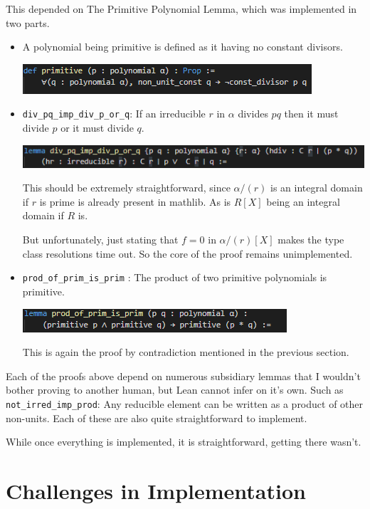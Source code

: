 \documentclass[pagesize=a4]{scrreprt}
\begin{document}
This depended on The Primitive Polynomial Lemma, which was implemented in two parts. 

\begin{itemize}
   \item A polynomial being primitive is defined as it having no constant divisors. 

   \includegraphics{def_prim.png}

   \item \texttt{div\_pq\_imp\_div\_p\_or\_q}: If an irreducible $r$ in $\alpha$ divides $pq$ then it must divide $p$ or it must divide $q$. 

    \includegraphics{div_pq.png}

    This should be extremely straightforward, since $\alpha/(r)$ is an integral domain if $r$ is prime is already present in mathlib. As is $R[X]$ being an integral domain if $R$ is.

    But unfortunately, just stating that $f = 0$ in $\alpha/(r)[X]$ makes the type class resolutions time out. So the core of the proof remains unimplemented.

    \item \texttt{prod\_of\_prim\_is\_prim} : The product of two primitive polynomials is primitive. 
    
    \includegraphics{prod_prim.png} 

    This is again the proof by contradiction mentioned in the previous section. 

\end{itemize}


Each of the proofs above depend on numerous subsidiary lemmas that I wouldn't bother proving to another human, but Lean cannot infer on it's own. Such as \texttt{not\_irred\_imp\_prod}: Any reducible element can be written as a product of other non-units. Each of these are also quite straightforward to implement. 

While once everything is implemented, it is straightforward, getting there wasn't.  

\chapter{Challenges in Implementation}
\end{document}
